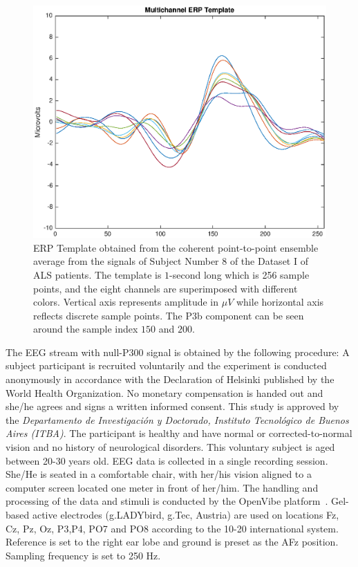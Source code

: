 \begin{figure}[h!]
\centering
\includegraphics[width=12cm]{images/erptemplate1.eps}
\caption[P300 ERP Template]{ERP Template obtained from the coherent point-to-point ensemble average from the signals of Subject Number 8 of the Dataset I of ALS patients. The template is $1$-second long which is 256 sample points, and the eight channels are superimposed with different colors.  Vertical axis represents amplitude in $\mu V$ while horizontal axis reflects discrete sample points. The P3b component can be seen around the sample index $150$ and $200$.}
\label{fig:erptemplate1}
\end{figure}

The EEG stream with null-P300 signal is obtained by the following procedure: 
A subject participant is recruited voluntarily and the experiment is conducted anonymously in accordance with the Declaration of Helsinki published by the World Health Organization.  No monetary compensation is handed out and she/he agrees and signs a written informed consent.  This study is approved by the \textit{Departamento de Investigación y Doctorado, Instituto Tecnológico de Buenos Aires (ITBA)}.  The participant is healthy and have normal or corrected-to-normal vision and no history of neurological disorders. This voluntary subject is aged between 20-30 years old.  EEG data is collected in a single recording session. She/He is seated in a comfortable chair, with her/his vision aligned to a computer screen located one meter in front of her/him.  The handling and processing of the data and stimuli is conducted by the OpenVibe platform~\cite{Renard2010}.  Gel-based active electrodes (g.LADYbird, g.Tec, Austria) are used on locations Fz, Cz, Pz, Oz, P3,P4, PO7 and PO8 according to the 10-20 international system.  Reference is set to the right ear lobe and ground is preset as the AFz position.   Sampling frequency is set to 250 Hz.

